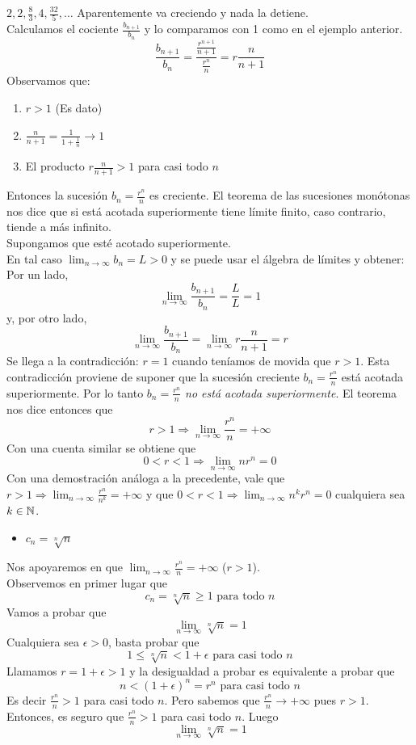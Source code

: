 \documentclass[../Teoría.root.tex]{subfiles}
\begin{document}
\(2,2,\frac{8}{3},4,\frac{32}{5},\dots\)
Aparentemente va creciendo y nada la detiene.\\
Calculamos el cociente \(\frac{b_{n+1}}{b_n}\) y lo comparamos con 1 como en el ejemplo anterior.
\[\frac{b_{n+1}}{b_n}=\frac{\frac{r^{n+1}}{n+1}}{\frac{r^n}{n}}=r\frac{n}{n+1}\]
Observamos que:
\begin{enumerate}
    \item \(r>1\) (Es dato)
    \item \(\frac{n}{n+1}=\frac{1}{1+\frac{1}{n}}\rightarrow1\)
    \item El producto \(r\frac{n}{n+1}>1\) para casi todo \(n\)
\end{enumerate}
Entonces la sucesión \(b_n=\frac{r^n}{n}\) es creciente.
El teorema de las sucesiones monótonas nos dice que si está acotada superiormente tiene límite finito, caso contrario, tiende a más infinito.\\
Supongamos que esté acotado superiormente.\\
En tal caso \(\lim_{n\to\infty}b_n=L>0\) y se puede usar el álgebra de límites y obtener:\\
Por un lado, \[\lim_{n\to\infty}\frac{b_{n+1}}{b_n}=\frac{L}{L}=1\]
y, por otro lado, \[\lim_{n\to\infty}\frac{b_{n+1}}{b_n}=\lim_{n\to\infty}r\frac{n}{n+1}=r\]
Se llega a la contradicción: \(r=1\) cuando teníamos de movida que \(r>1\).
Esta contradicción proviene de suponer que la sucesión creciente \(b_n=\frac{r^n}{n}\) está acotada superiormente.
Por lo tanto \(b_n=\frac{r^n}{n}\) \textit{no está acotada superiormente}.
El teorema nos dice entonces que \[r>1\Rightarrow\lim_{n\to\infty}\frac{r^n}{n}=+\infty\]
Con una cuenta similar se obtiene que \[0<r<1\Rightarrow\lim_{n\to\infty}nr^n=0\]
Con una demostración análoga a la precedente, vale que
\(r>1\Rightarrow\lim_{n\to\infty}\frac{r^n}{n^k}=+\infty\) y que \(0<r<1\Rightarrow\lim_{n\to\infty}n^kr^n=0\) cualquiera sea \(k\in\mathbb{N}\).
\begin{itemize}
    \item \(c_n=\sqrt[n]{n}\)
\end{itemize}
Nos apoyaremos en que \(\lim_{n\to\infty}\frac{r^n}{n}=+\infty\) (\(r>1\)).\\
Observemos en primer lugar que \[c_n=\sqrt[n]{n}\geq1\text{ para todo }n\]
Vamos a probar que \[\lim_{n\to\infty}\sqrt[n]{n}=1\]
Cualquiera sea \(\epsilon>0\), basta probar que \[1\leq\sqrt[n]{n}<1+\epsilon\text{ para casi todo }n\]
Llamamos \(r=1+\epsilon>1\) y la desigualdad a probar es equivalente a probar que \[n<(1+\epsilon)^n=r^n\text{ para casi todo }n\]
Es decir \(\frac{r^n}{n}>1\) para casi todo \(n\). Pero sabemos que \(\frac{r^n}{n}\rightarrow+\infty\) pues \(r>1\).
Entonces, es seguro que \(\frac{r^n}{n}>1\) para casi todo \(n\).
Luego \[\lim_{n\to\infty}\sqrt[n]{n}=1\]
\end{document}
